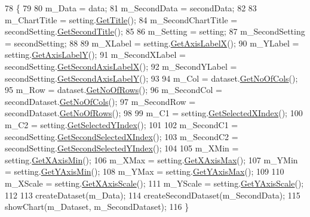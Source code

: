 \begin{DoxyCode}
78                                          \{
79         
80         m\_Data = data;
81         m\_SecondData = secondData;
82         
83         m\_ChartTitle = setting.\hyperlink{class_data_attribute_ade9747a192ba22fe1020e874bff6a48c}{GetTitle}();
84         m\_SecondChartTitle = secondSetting.\hyperlink{class_data_attribute_a4079522c93025fce7569eaed585f4aeb}{GetSecondTitle}();
85         
86         m\_Setting = setting;
87         m\_SecondSetting = secondSetting;
88         
89         m\_XLabel = setting.\hyperlink{class_data_attribute_aecb451704a87d77dd80dbad8a19099d1}{GetAxisLabelX}();
90         m\_YLabel = setting.\hyperlink{class_data_attribute_af5f68794cd0195d42135d5e48120ccc0}{GetAxisLabelY}();
91         m\_SecondXLabel = secondSetting.\hyperlink{class_data_attribute_a8ace4cb1fee9e2abeabe3efc9a190c8f}{GetSecondAxisLabelX}();
92         m\_SecondYLabel = secondSetting.\hyperlink{class_data_attribute_a6efb7e067317898feefbbf6bd472b998}{GetSecondAxisLabelY}();
93         
94         m\_Col = dataset.\hyperlink{class_dataset_ab922bef50c8aa1531de8704731779246}{GetNoOfCols}();
95         m\_Row = dataset.\hyperlink{class_dataset_a91257a605317576e87e1c32e54739e51}{GetNoOfRows}();
96         m\_SecondCol = secondDataset.\hyperlink{class_dataset_ab922bef50c8aa1531de8704731779246}{GetNoOfCols}();
97         m\_SecondRow = secondDataset.\hyperlink{class_dataset_a91257a605317576e87e1c32e54739e51}{GetNoOfRows}();
98         
99         m\_C1 = setting.\hyperlink{class_data_attribute_a0f4a54973bc44b0526f78bda945dc81b}{GetSelectedXIndex}();
100         m\_C2 = setting.\hyperlink{class_data_attribute_a82e7519853d9f470ea183dd0c39a03d6}{GetSelectedYIndex}();
101 
102         m\_SecondC1 = secondSetting.\hyperlink{class_data_attribute_a7f501790eee650ddf9ac17c4f63a3995}{GetSecondSelectedXIndex}();
103         m\_SecondC2 = secondSetting.\hyperlink{class_data_attribute_a6f61ad05915f4aa31ad3dba00596da64}{GetSecondSelectedYIndex}();
104         
105         m\_XMin = setting.\hyperlink{class_data_attribute_afa9da883abc4abad5f64c045de114c50}{GetXAxisMin}();
106         m\_XMax = setting.\hyperlink{class_data_attribute_ada370712422c7cbd21b7be4a0d88caf7}{GetXAxisMax}();
107         m\_YMin = setting.\hyperlink{class_data_attribute_af0786b4de674874c0bb8ca9dbe1519c6}{GetYAxisMin}();
108         m\_YMax = setting.\hyperlink{class_data_attribute_a81243eb8f7008e05e74b0f3571d2f08d}{GetYAxisMax}();
109         
110         m\_XScale = setting.\hyperlink{class_data_attribute_a5a1de25600487aa958a19ce01151fea4}{GetXAxisScale}();
111         m\_YScale = setting.\hyperlink{class_data_attribute_a95259727ce91efc0e0eaa28487d944c5}{GetYAxisScale}();
112 
113         createDataset(m\_Data);
114         createSecondDataset(m\_SecondData);
115         showChart(m\_Dataset, m\_SecondDataset);
116     \}  
\end{DoxyCode}
